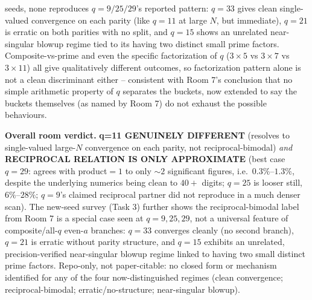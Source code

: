 seeds, none reproduces $q=9/25/29$'s reported pattern: $q=33$ gives clean single-valued
convergence on each parity (like $q=11$ at large $N$, but immediate), $q=21$ is erratic on both
parities with no split, and $q=15$ shows an unrelated near-singular blowup regime tied to its
having two distinct small prime factors. Composite-vs-prime and even the specific factorization
of $q$ ($3\times5$ vs $3\times7$ vs $3\times11$) all give qualitatively different outcomes, so
factorization pattern alone is not a clean discriminant either -- consistent with Room 7's
conclusion that no simple arithmetic property of $q$ separates the buckets, now extended to say
the buckets themselves (as named by Room 7) do not exhaust the possible behaviours.

\textbf{Overall room verdict.} \textbf{q=11 GENUINELY DIFFERENT} (resolves to single-valued
large-$N$ convergence on each parity, not reciprocal-bimodal) \emph{and}
\textbf{RECIPROCAL RELATION IS ONLY APPROXIMATE} (best case $q=29$: agrees with product$=1$ to
only $\sim2$ significant figures, i.e.\ $0.3\%$--$1.3\%$, despite the underlying numerics being
clean to $40+$ digits; $q=25$ is looser still, $6\%$--$28\%$; $q=9$'s claimed reciprocal partner
did not reproduce in a much denser scan). The new-seed survey (Task 3) further shows the
reciprocal-bimodal label from Room 7 is a special case seen at $q=9,25,29$, not a universal
feature of composite/all-$q$ even-$a$ branches: $q=33$ converges cleanly (no second branch),
$q=21$ is erratic without parity structure, and $q=15$ exhibits an unrelated, precision-verified
near-singular blowup regime linked to having two small distinct prime factors. Repo-only, not
paper-citable: no closed form or mechanism identified for any of the four now-distinguished
regimes (clean convergence; reciprocal-bimodal; erratic/no-structure; near-singular blowup).
